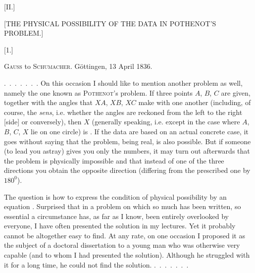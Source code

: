 \clearpage{}

\begin{center}
[II.]

[THE PHYSICAL POSSIBILITY OF THE DATA IN POTHENOT'S PROBLEM.]

[1.]
\end{center}

\begin{center}
\textsc{Gauss} to \textsc{Schumacher}. Göttingen, 13 April 1836.
\end{center}

\indent \mbox{. . . . . . .} On this occasion I should like to mention another problem as well, namely the one known as \textsc{Pothenot}'s problem. If three points $A$, $B$, $C$ are given, together with the angles that $XA$, $XB$, $XC$ make with one another (including, of course, the \emph{sens}, i.e. whether the angles are reckoned from the left to the right [side] or conversely), then $X$ (generally speaking, i.e. except in the case where $A$, $B$, $C$, $X$ lie on one circle) is . If the data are based on an actual concrete case, it goes without saying that the problem, being real, is also possible. But if someone (to lead you astray) gives you only the numbers, it may turn out afterwards that the problem is physically impossible and that instead of one of the three directions you obtain the opposite direction (differing from the prescribed one by $180^0$).

The question is how  to express the condition of physical possibility by an equation . Surprised that in a problem on which so much has been written, so essential a circumstance has, as far as I know, been entirely overlooked by everyone, I have often presented the solution in my lectures. Yet it probably cannot be altogether easy to find. At any rate, on one occasion I proposed it as the subject of a doctoral dissertation to a young man who was otherwise very capable (and to whom I had  presented the solution). Although he struggled with it for a long time, he could not find the solution. \mbox{. . . . . . .}
